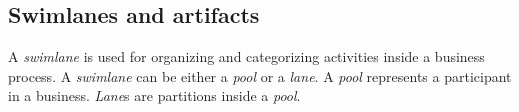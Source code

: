 \begin{table}[th]
\begin{tabular}{ cp{10.5cm} }
\\ %
\end{tabular}
\end{table}


\subsection{Swimlanes and artifacts}
A \emph{swimlane} is used for organizing and categorizing activities inside a business process. A \emph{swimlane} can be either a \emph{pool} or a \emph{lane}.  A \emph{pool} represents a participant in a business. %
\emph{Lane}s are partitions inside a \emph{pool}.

